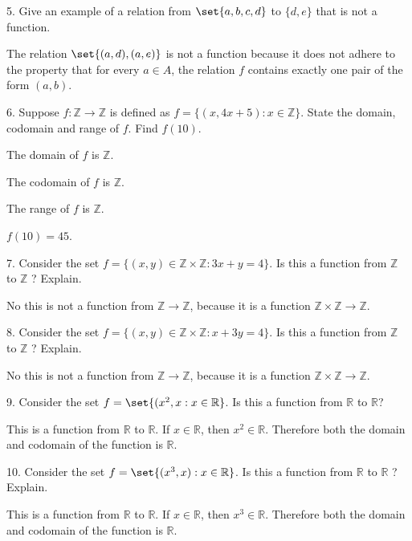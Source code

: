 \documentclass{hippoidC}
\begin{document}
\begin{prooflist}{5. Give an example of a relation from $\set{a, b, c, d}$ to
		$\{d, e\}$ that is not a function.}
	\item The relation $\set{(a, d), (a, e)}$ is not a function because it does not
	adhere to the property that for every $a \in A$, the relation $f$ contains
	exactly one pair of the form $(a, b)$.
\end{prooflist}

\begin{prooflist}{6. Suppose $f: \mathbb{Z} \rightarrow \mathbb{Z}$ is defined
		as $f=\{(x, 4 x+5): x \in \mathbb{Z}\}$. State the domain, codomain and
		range of $f$. Find $f(10)$.}
	\item The domain of $f$ is $\mathbb{Z}$.
	\item The codomain of $f$ is $\mathbb{Z}$.
	\item The range of $f$ is $\mathbb{Z}$.
	\item $f(10)=45$.
\end{prooflist}

\begin{prooflist}{7. Consider the set $f=\{(x, y) \in \mathbb{Z} \times
			\mathbb{Z}: 3 x+y=4\}$. Is this a function from $\mathbb{Z}$ to $\mathbb{Z}$
		? Explain.}
	\item No this is not a function from $\mathbb{Z}\rightarrow\mathbb{Z}$, because
	it is a function $\mathbb{Z}\times\mathbb{Z}\rightarrow\mathbb{Z}$.
\end{prooflist}

\begin{prooflist}{8. Consider the set $f=\{(x, y) \in \mathbb{Z} \times
			\mathbb{Z}: x+3 y=4\}$. Is this a function from $\mathbb{Z}$ to $\mathbb{Z}$
		? Explain.}
	\item No this is not a function from $\mathbb{Z}\rightarrow\mathbb{Z}$, because
	it is a function $\mathbb{Z}\times\mathbb{Z}\rightarrow\mathbb{Z}$.
\end{prooflist}

\begin{prooflist}{9. Consider the set $f=\set{(x^2, x: x \in
				\mathbb{R}}$. Is this a function from $\mathbb{R}$ to $\mathbb{R}$?}
	\item This is a function from $\mathbb{R}$ to $\mathbb{R}$. If $x\in \mathbb{R}$, then
	$x^2 \in \mathbb{R}$. Therefore both the domain and codomain of the function
	is $\mathbb{R}$.
\end{prooflist}

\begin{prooflist}{10. Consider the set $f=\set{(x^3, x): x \in
				\mathbb{R}}$. Is this a function from $\mathbb{R}$ to $\mathbb{R}$ ?
		Explain.}
	\item This is a function from $\mathbb{R}$ to $\mathbb{R}$. If $x\in \mathbb{R}$, then
	$x^3 \in \mathbb{R}$. Therefore both the domain and codomain of the function
	is $\mathbb{R}$.
\end{prooflist}
\end{document}
